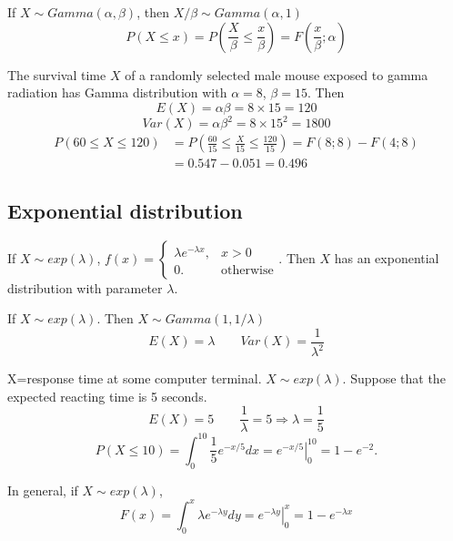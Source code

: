 \begin{prop}
If $X\sim Gamma(\alpha,\beta)$, then $X/\beta \sim Gamma(\alpha,1)$
\[P(X\leq x)=P\left(\frac{X}{\beta} \leq \frac{x}{\beta}\right)=F\left(\frac{x}{\beta};\alpha \right)\]
\end{prop}

\begin{exmp}
The survival time $X$ of a randomly selected male mouse exposed to gamma radiation has Gamma distribution with $\alpha=8$, $\beta=15$. Then
\[E(X)=\alpha\beta =8 \times 15 =120\]
\[Var(X)=\alpha \beta^2 =8 \times 15^2 =1800\]
\begin{align*}
P(60 \leq X \leq 120)&=P\left(\frac{60}{15}\leq\frac{X}{15} \leq\frac{120}{15} \right)=F(8;8)-F(4;8) \\
&=0.547-0.051=0.496
\end{align*}
\end{exmp}

\subsection{Exponential distribution}
If $X\sim exp(\lambda)$,
$f(x)=\begin{cases}
\lambda e^{-\lambda x}, 	& x >0\\
0. &\text{otherwise}
\end{cases}$. Then $X$ has an exponential distribution with parameter $\lambda$.

\begin{prop}
If $X\sim exp(\lambda)$. Then $X \sim Gamma(1,1/\lambda)$
\[E(X)=\lambda \qquad Var(X)=\frac{1}{\lambda^2}\]
\end{prop}

\begin{exmp}
X=response time at some computer terminal. $X \sim exp(\lambda)$. Suppose that the expected reacting time is 5 seconds.
\[E(X)=5 \qquad \frac{1}{\lambda}=5 \Rightarrow \lambda=\frac{1}{5}\]
\[P(X\leq 10)=\int_0^{10} \frac{1}{5} e^{-x/5} dx=\left. e^{-x/5}\right|_{0}^{10}=1-e^{-2}. \]
\end{exmp}


In general, if $X\sim exp(\lambda)$,
\[F(x)=\int_0^{x} \lambda e^{-\lambda y} dy=\left. e^{-\lambda y}\right|_{0}^{x}=1-e^{-\lambda x}\]

